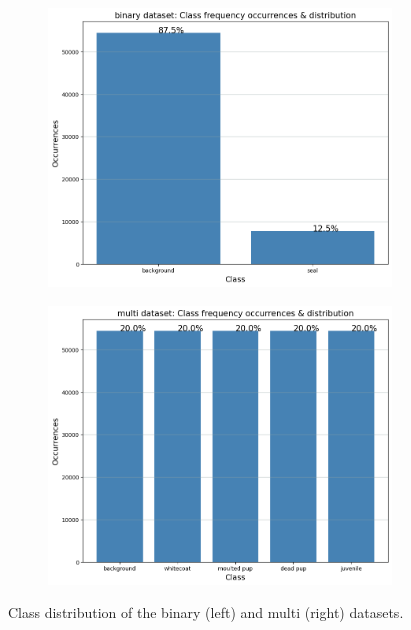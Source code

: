 \documentclass[letterpaper,12pt]{article}
\begin{document}
\begin{figure}[h]
\centering
\begin{subfigure}{.5\textwidth}
  \centering
  \includegraphics[width=\textwidth]{results/binary_class_distribution.png}
  \label{fig:binary_class_distribution}
\end{subfigure}%
\begin{subfigure}{.5\textwidth}
  \centering
  \includegraphics[width=\textwidth]{results/multi_class_distribution.png}
  \label{fig:multi_class_distribution}
\end{subfigure}
\caption{\label{fig:class_distribution}Class distribution of the binary (left) and multi (right) datasets.}
\end{figure}
\end{document}
